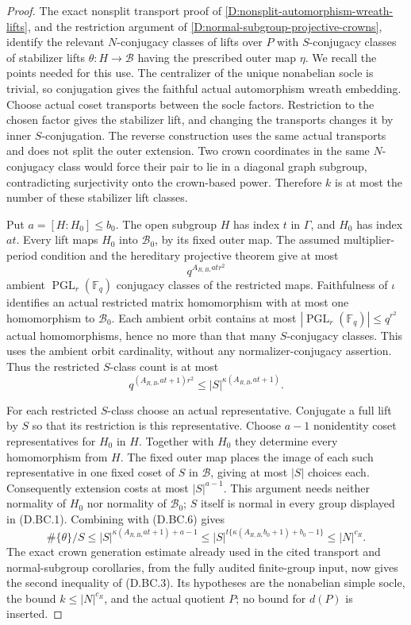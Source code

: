 \begin{proof}
The exact nonsplit transport proof of
\ref{D:nonsplit-automorphism-wreath-lifts}, and the
restriction argument of
\ref{D:normal-subgroup-projective-crowns}, identify the
relevant $N$-conjugacy classes of lifts over $P$ with
$S$-conjugacy classes of stabilizer lifts
$\theta:H\to\mathcal B$ having the prescribed outer map
$\eta$. We recall the points needed for this use.
The centralizer of the unique nonabelian socle is trivial,
so conjugation gives the faithful actual automorphism
wreath embedding. Choose actual coset transports between
the socle factors. Restriction to the chosen factor gives
the stabilizer lift, and changing the transports changes
it by inner $S$-conjugation. The reverse construction
uses the same actual transports and does not split the
outer extension. Two crown coordinates in the same
$N$-conjugacy class would force their pair to lie in a
diagonal graph subgroup, contradicting surjectivity onto
the crown-based power. Therefore $k$ is at most the
number of these stabilizer lift classes.

Put $a=[H:H_0]\le b_0$. The open subgroup $H$ has
index $t$ in $\Gamma$, and $H_0$ has index $at$.
Every lift maps $H_0$ into $\mathcal B_0$, by its fixed
outer map. The assumed multiplier-period condition and
the hereditary projective theorem give at most
\[
                         q^{A_{R,B_*}at r^2}            \tag{D.BC.5}
\]
ambient $\operatorname{PGL}_r(\mathbb F_q)$ conjugacy
classes of the restricted maps. Faithfulness of $\iota$
identifies an actual restricted matrix homomorphism with
at most one homomorphism to $\mathcal B_0$.
Each ambient orbit contains at most
$|\operatorname{PGL}_r(\mathbb F_q)|\le q^{r^2}$
actual homomorphisms, hence no more than that many
$S$-conjugacy classes. This uses the ambient orbit
cardinality, without any normalizer-conjugacy assertion.
Thus the restricted $S$-class count is at most
\[
       q^{(A_{R,B_*}at+1)r^2}
                   \le |S|^{\kappa(A_{R,B_*}at+1)}.     \tag{D.BC.6}
\]

For each restricted $S$-class choose an actual
representative. Conjugate a full lift by $S$ so that
its restriction is this representative. Choose $a-1$
nonidentity coset representatives for $H_0$ in $H$.
Together with $H_0$ they determine every homomorphism
from $H$. The fixed outer map places the image of
each such representative in one fixed coset of $S$
in $\mathcal B$, giving at most $|S|$ choices each.
Consequently extension costs at most $|S|^{a-1}$.
This argument needs neither normality of $H_0$ nor
normality of $\mathcal B_0$; $S$ itself is normal
in every group displayed in (D.BC.1).
Combining with (D.BC.6) gives
\[
 \#\{\theta\}/S
   \le |S|^{\kappa(A_{R,B_*}at+1)+a-1}
   \le |S|^{t\{\kappa(A_{R,B_*}b_0+1)+b_0-1\}}
   \le |N|^{c_R}.                                    \tag{D.BC.7}
\]
The exact crown generation estimate already used in
the cited transport and normal-subgroup corollaries,
from the fully audited finite-group input, now gives
the second inequality of (D.BC.3). Its hypotheses are
the nonabelian simple socle, the bound $k\le|N|^{c_R}$,
and the actual quotient $P$; no bound for $d(P)$ is
inserted.


\end{proof}
